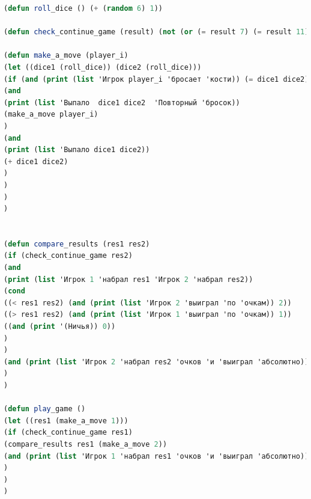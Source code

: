 \documentclass[12pt]{report}
\begin{document}
\begin{lstlisting}[language=Lisp]
(defun roll_dice () (+ (random 6) 1))

(defun check_continue_game (result) (not (or (= result 7) (= result 11))))

(defun make_a_move (player_i) 
(let ((dice1 (roll_dice)) (dice2 (roll_dice)))
(if (and (print (list 'Игрок player_i 'бросает 'кости)) (= dice1 dice2) (or (= dice1 1) (= dice1 6)))
(and 
(print (list 'Выпало  dice1 dice2  'Повторный 'бросок)) 
(make_a_move player_i)
)
(and 
(print (list 'Выпало dice1 dice2))
(+ dice1 dice2)
)
)
)
)


(defun compare_results (res1 res2) 
(if (check_continue_game res2)
(and
(print (list 'Игрок 1 'набрал res1 'Игрок 2 'набрал res2))
(cond 
((< res1 res2) (and (print (list 'Игрок 2 'выиграл 'по 'очкам)) 2))
((> res1 res2) (and (print (list 'Игрок 1 'выиграл 'по 'очкам)) 1))
((and (print '(Ничья)) 0))
)
)	
(and (print (list 'Игрок 2 'набрал res2 'очков 'и 'выиграл 'абсолютно)) 2)
)
)

(defun play_game () 
(let ((res1 (make_a_move 1)))
(if (check_continue_game res1)
(compare_results res1 (make_a_move 2))
(and (print (list 'Игрок 1 'набрал res1 'очков 'и 'выиграл 'абсолютно)) 1)
)
)
)

\end{lstlisting}

	

	
\end{document}
